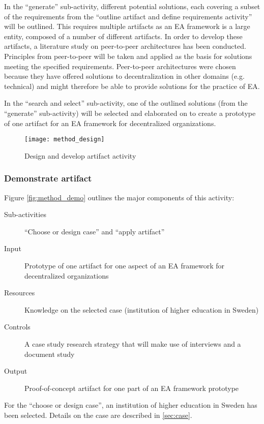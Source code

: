 In the ``generate'' sub-activity, different potential solutions, each covering a subset of the requirements from the ``outline artifact and define requirements activity'' will be outlined. This requires multiple artifacts as an EA framework is a large entity, composed of a number of different artifacts. In order to develop these artifacts, a literature study on peer-to-peer architectures has been conducted. Principles from peer-to-peer will be taken and applied as the basis for solutions meeting the specified requirements. Peer-to-peer architectures were chosen because they have offered solutions to decentralization in other domains (e.g. technical) and might therefore be able to provide solutions for the practice of EA. 

In the ``search and select'' sub-activity, one of the outlined solutions (from the ``generate'' sub-activity) will be selected and elaborated on to create a prototype of one artifact for an EA framework for decentralized organizations. 

\begin{figure}
\centering
\texttt{[image: method\_design]}
\caption{Design and develop artifact activity}
\label{fig:method_design}
\end{figure}
  
\subsubsection*{Demonstrate artifact}

Figure \ref{fig:method_demo} outlines the major components of this activity:
\begin{description}
  \item[Sub-activities]  ``Choose or design case'' and ``apply artifact''~\cite[Ch. 8]{johannessonPerjons2012}
  \item[Input]  Prototype of one artifact for one aspect of an EA framework for decentralized organizations
  \item[Resources]  Knowledge on the selected case (institution of higher education in Sweden)
  \item[Controls]  A case study research strategy that will make use of interviews and a document study
  \item[Output] Proof-of-concept artifact for one part of an EA framework prototype
\end{description}

For the ``choose or design case'', an institution of higher education in Sweden has been selected. Details on the case are described in \ref{sec:case}.

